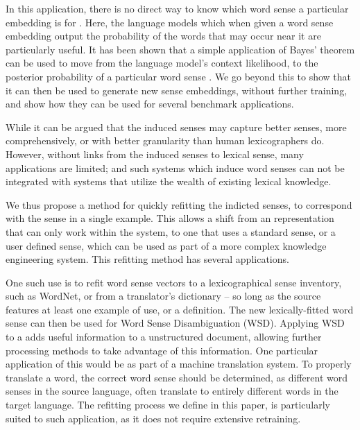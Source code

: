 \documentclass{sig-alternate}
\begin{document}
In this application, there is no direct way to know which word sense a particular embedding is for \parencite{Reisinger2010,Huang2012,tian2014probabilistic, AdaGrams}.
Here, the language models which when given a word sense embedding output the probability of the words that may occur near it are particularly useful. It has been shown that a simple application of Bayes' theorem can be used to move from the language model's context likelihood, to the posterior probability of a particular word sense \cite{tian2014probabilistic,AdaGrams}. We go beyond this to show that it can then be used to generate new sense embeddings, without further training, and show how they can be used for several benchmark applications.


While it can be argued that the induced senses may capture better senses, more comprehensively, or with better granularity than human lexicographers do.
However, without links from the induced senses to lexical sense, many applications are limited; and such systems which induce word senses can not be integrated with systems that utilize the wealth of existing lexical knowledge.

We thus propose a method for quickly refitting the indicted senses, to correspond with the sense in a single example. This allows a shift from an representation that can only work within the system, to one that uses a standard sense, or a user defined sense, which can be used as part of a more complex knowledge engineering system. This refitting method  has several applications.


One such use is to refit word sense vectors to a lexicographical sense inventory, such as WordNet, or from a translator's dictionary -- so long as the source features at least one example of use, or a definition. The new lexically-fitted word sense can then be used for Word Sense Disambiguation (WSD). Applying WSD to a adds useful information to a unstructured document, allowing further processing methods to take advantage of this information. One particular application of this would be as part of a machine translation system. To properly translate a word, the correct word sense should be determined, as different word senses in the source language, often translate to entirely different words in the target language. The refitting process we define in this paper, is particularly suited to such application, as it does not require extensive retraining.
\end{document}
